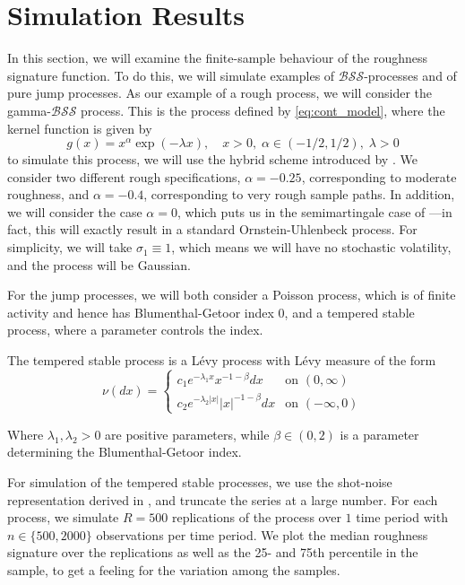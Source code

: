 \documentclass[fleqn,11pt,letterpaper]{article}
\theoremstyle{plain}
\theoremstyle{definition}
\theoremstyle{remark}
\numberwithin{equation}{section}
\begin{document}
\section{Simulation Results}\label{sec:sim_study}

In this section, we will examine the finite-sample behaviour of the roughness signature function. To do this, we will simulate examples of $\mathcal{BSS}$-processes and of pure jump processes. As our example of a rough process, we will consider the gamma-$\mathcal{BSS}$ process. This is the process defined by \eqref{eq:cont_model}, where the kernel function is given by 
\begin{equation}\label{eq:gamma_BSS}
    g(x)=x^\alpha\exp(-\lambda x),\quad x>0,\;\alpha\in(-1/2,1/2),\;\lambda>0
\end{equation}
to simulate this process, we will use the hybrid scheme introduced by \cite{BLP2017}. We consider two different rough specifications, $\alpha=-0.25$, corresponding to moderate roughness, and $\alpha=-0.4$, corresponding to very rough sample paths. In addition, we will consider the case $\alpha=0$, which puts us in the semimartingale case of \cite{Todorov2010}---in fact, this will exactly result in a standard Ornstein-Uhlenbeck process. For simplicity, we will  take $\sigma_1\equiv1$, which means we will have no stochastic volatility, and the process will be Gaussian. 

For the jump processes, we will both consider a Poisson process, which is of finite activity and hence has Blumenthal-Getoor index 0, and a tempered stable process, where a parameter controls the index. 

The tempered stable process is a Lévy process with Lévy measure of the form 
\begin{equation}
    \nu(dx)=\begin{cases}
c_{1}e^{-\lambda_1x}x^{-1-\beta}dx & \text{on }(0,\infty)\\
c_{2}e^{-\lambda_2\vert x\vert}\vert x\vert^{-1-\beta}dx & \text{on }(-\infty,0)
\end{cases}
\end{equation}

Where $\lambda_1,\lambda_2>0$ are positive parameters, while $\beta\in(0,2)$ is a parameter determining the Blumenthal-Getoor index. 

For simulation of the tempered stable processes, we use the shot-noise representation derived in \cite{Rosinski2007}, and truncate the series at a large number. For each process, we simulate $R=500$ replications of the process over $1$ time period with $n\in\{500,2000\}$ observations per time period. We plot the median roughness signature over the replications as well as the 25- and 75th percentile in the sample, to get a feeling for the variation among the samples. 
\end{document}
